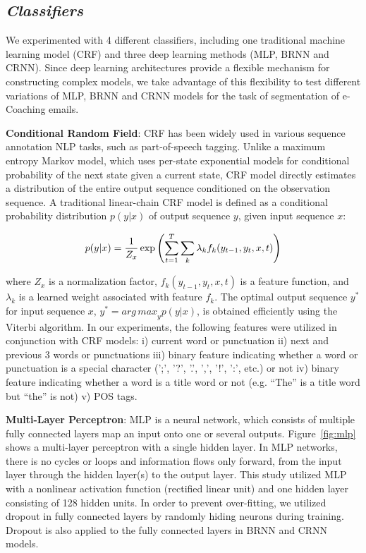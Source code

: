 \documentclass{amia}
\begin{document}
\subsection*{\textit{Classifiers}}

We experimented with 4 different classifiers, including one traditional machine learning model (CRF) and three deep learning methods (MLP, BRNN and CRNN). Since deep learning architectures provide a flexible mechanism for constructing complex models, we take advantage of this flexibility to test different variations of MLP, BRNN and CRNN models for the task of segmentation of e-Coaching emails.

\textbf{Conditional Random Field}: CRF has been widely used in various sequence annotation NLP tasks, such as part-of-speech tagging.\cite{lafferty2001conditional, hirohata2008identifying} Unlike a maximum entropy Markov model, which uses per-state exponential models for conditional probability of the next state given a current state, CRF model directly estimates a distribution of the entire output sequence conditioned on the observation sequence. A traditional linear-chain CRF model is defined as a conditional probability distribution $p(y|x)$ of output sequence $y$, given input sequence $x$:

\begin{equation}
\label{Eq:crf}
p(y|x) = \frac{1}{Z_x}\exp{\left(\sum_{t=1}^{T}\sum_{k}^{}\lambda_k f_k(y_{t-1}, y_t, x, t)\right)} \\
\end{equation}

where $Z_x$ is a normalization factor, $f_k(y_{t-1}, y_t, x, t)$ is a feature function, and $\lambda_k$ is a learned weight associated with feature $f_k$. The optimal output sequence $y^*$ for input sequence $x$, $y^* = {arg\,max}_y p(y|x)$, is obtained efficiently using the Viterbi algorithm. In our experiments, the following features were utilized in conjunction with CRF models: i) current word or punctuation ii) next and previous 3 words or punctuations iii) binary feature indicating whether a word or punctuation is a special character (';', '?', '.', ',', '!', ':', etc.) or not iv) binary feature indicating whether a word is a title word or not (e.g. ``The'' is a title word but ``the'' is not) v) POS tags.   

\textbf{Multi-Layer Perceptron}: MLP is a neural network, which consists of multiple fully connected layers map an input onto one or several outputs.\cite{rumelhart1986learning} Figure~\ref{fig:mlp} shows a multi-layer perceptron with a single hidden layer. In MLP networks, there is no cycles or loops and information flows only forward, from the input layer through the hidden layer(s) to the output layer. This study utilized MLP with a nonlinear activation function (rectified linear unit) and one hidden layer consisting of 128 hidden units. In order to prevent over-fitting, we utilized dropout in fully connected layers by randomly hiding neurons during training. \cite{srivastava2014dropout} Dropout is also applied to the fully connected layers in BRNN and CRNN models. 
\end{document}
